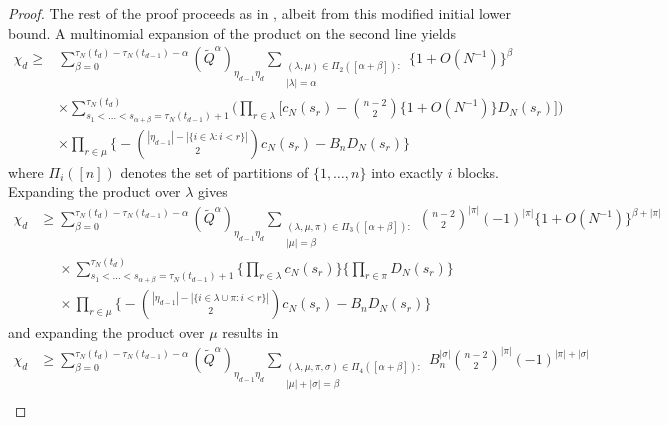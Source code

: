\documentclass{article} %
\theoremstyle{definition}
\newcommand{\1}[1]{\mathbbm{1}_{\{#1\}}}
\begin{document}
\begin{proof}
The rest of the proof proceeds as in \cite{koskela2018}, albeit from this modified initial lower bound.
A multinomial expansion of the product on the second line yields 
\begin{align*}
\chi_d \geq {}& \sum_{ \beta = 0 }^{ \tau_N( t_d ) - \tau_N( t_{ d - 1 } ) - \alpha } ( \tilde{ Q }^{ \alpha } )_{ \eta_{ d - 1 } \eta_d } \sum_{\substack{ ( \lambda, \mu ) \in \Pi_2( [ \alpha + \beta ] ) :\\ | \lambda | = \alpha }} \{ 1 + O( N^{ -1 } ) \}^{ \beta } \\
&\times \sum_{ s_1 < \ldots < s_{ \alpha + \beta } = \tau_N( t_{ d - 1 } ) + 1 }^{ \tau_N( t_d ) } \Bigg( \prod_{ r \in \lambda } \Bigg[ c_N( s_r ) - \binom{ n - 2 }{ 2 } \{ 1 + O( N^{ -1 } ) \} D_N( s_r ) \Bigg] \Bigg)\\
&\times \prod_{ r \in \mu } \Bigg\{ - \binom{ | \eta_{ d - 1 } | - | \{ i \in \lambda : i < r \} | }{ 2 } c_N( s_r ) - B_n D_N( s_r ) \Bigg\}
\end{align*}
where $\Pi_i([n])$ denotes the set of partitions of $\{1, \dots,n\}$ into exactly $i$ blocks.
Expanding the product over $\lambda$ gives
\begin{align*}
\chi_d &\geq \sum_{ \beta = 0 }^{ \tau_N( t_d ) - \tau_N( t_{ d - 1 } ) - \alpha } ( \tilde{ Q }^{ \alpha } )_{ \eta_{ d - 1 } \eta_d } \sum_{\substack{ ( \lambda, \mu, \pi ) \in \Pi_3( [ \alpha + \beta ] ) :\\ | \mu | = \beta }} \binom{ n - 2 }{ 2 }^{ | \pi | } ( -1 )^{ | \pi | } \{ 1 + O( N^{ -1 } ) \}^{ \beta + | \pi | } \\
&\phantom{\geq} \times \sum_{ s_1 < \ldots < s_{ \alpha + \beta } = \tau_N( t_{ d - 1 } ) + 1 }^{ \tau_N( t_d ) } \Bigg\{ \prod_{ r \in \lambda } c_N( s_r ) \Bigg\} \Bigg\{ \prod_{ r \in \pi }  D_N( s_r ) \Bigg\} \\
&\phantom{\geq} \times \prod_{ r \in \mu } \Bigg\{ - \binom{ | \eta_{ d - 1 } | - | \{ i \in \lambda \cup \pi : i < r \} | }{ 2 } c_N( s_r ) - B_n D_N( s_r ) \Bigg\}
\end{align*}
and expanding the product over $\mu$ results in
\begin{align*}
\chi_d &\geq \sum_{ \beta = 0 }^{ \tau_N( t_d ) - \tau_N( t_{ d - 1 } ) - \alpha } ( \tilde{ Q }^{ \alpha } )_{ \eta_{ d - 1 } \eta_d } \sum_{\substack{ ( \lambda, \mu, \pi, \sigma ) \in \Pi_4( [ \alpha + \beta ] ) :\\ | \mu | + | \sigma | = \beta }} B_n^{ | \sigma | } \binom{ n - 2 }{ 2 }^{ | \pi | } ( -1 )^{ | \pi | + | \sigma | } \\

\end{align*}
\end{proof}
\end{document}
